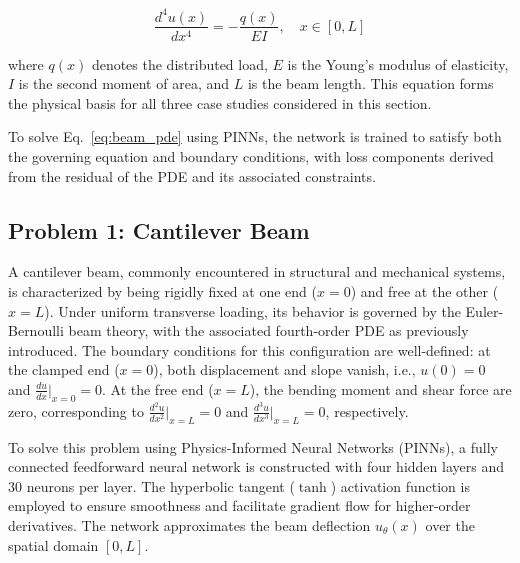 \documentclass[twocolumn]{svjour3}
\begin{document}
	\begin{equation}
		\frac{d^4 u(x)}{dx^4} = -\frac{q(x)}{EI}, \quad x \in [0, L]
		\label{eq:beam_pde}
	\end{equation}
	
	where $q(x)$ denotes the distributed load, $E$ is the Young's modulus of elasticity, $I$ is the second moment of area, and $L$ is the beam length. This equation forms the physical basis for all three case studies considered in this section.
	
	To solve Eq.~\eqref{eq:beam_pde} using PINNs, the network is trained to satisfy both the governing equation and boundary conditions, with loss components derived from the residual of the PDE and its associated constraints.
	
	\subsection{Problem 1: Cantilever Beam}
	
	A cantilever beam, commonly encountered in structural and mechanical systems, is characterized by being rigidly fixed at one end ($x=0$) and free at the other ($x=L$). Under uniform transverse loading, its behavior is governed by the Euler-Bernoulli beam theory, with the associated fourth-order PDE as previously introduced. The boundary conditions for this configuration are well-defined: at the clamped end ($x=0$), both displacement and slope vanish, i.e., $u(0) = 0$ and $\frac{du}{dx}|_{x=0} = 0$. At the free end ($x=L$), the bending moment and shear force are zero, corresponding to $\frac{d^2u}{dx^2}|_{x=L} = 0$ and $\frac{d^3u}{dx^3}|_{x=L} = 0$, respectively.
	
	To solve this problem using Physics-Informed Neural Networks (PINNs), a fully connected feedforward neural network is constructed with four hidden layers and 30 neurons per layer. The hyperbolic tangent ($\tanh$) activation function is employed to ensure smoothness and facilitate gradient flow for higher-order derivatives. The network approximates the beam deflection $u_\theta(x)$ over the spatial domain $[0,L]$.
	
\end{document}
